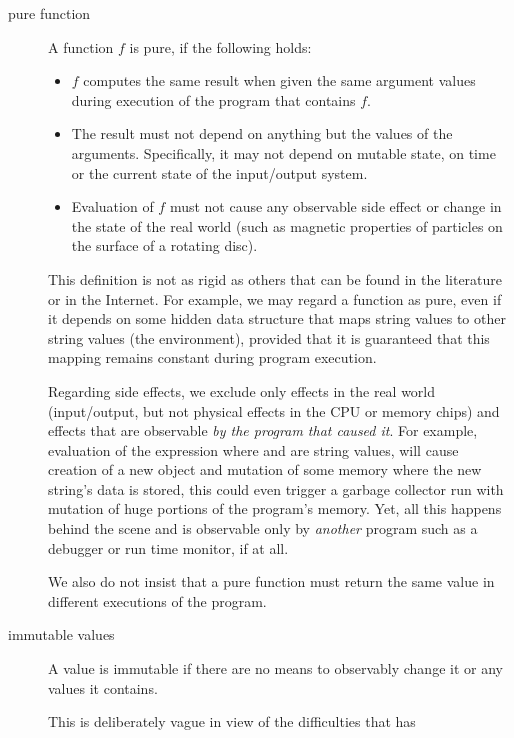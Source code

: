 \begin{description}
\item[pure function] A function $f$ is pure, if the following holds:
\begin{itemize}
\item $f$ computes the same result when given the same argument values during execution of the program that contains $f$.
\item The result must not depend on anything but the values of the arguments. Specifically, it may not depend on mutable state, on time or the current state of the input/output system.
\item Evaluation of $f$ must not cause any observable side effect or change in the state of the real world (such as magnetic properties of particles on the surface of a rotating disc).
\end{itemize}
This definition is not as rigid as others that can be found in the literature or in the Internet. For example, we may regard a function  as pure, even if it depends on some hidden data structure that maps string values to other string values (the environment), provided that it is guaranteed that this mapping remains constant during program execution. 

Regarding side effects, we exclude only effects in the real world (input/output, but not physical effects in the CPU or memory chips) and effects that are observable \emph{by the program that caused it}. For example, evaluation of the expression
where  and  are string values, will cause creation of a new \java{}  object and mutation of some memory where the new string's data is stored, this could even trigger a garbage collector run with mutation of huge portions of the program's memory. Yet, all this happens behind the scene and is observable only by \emph{another} program such as a debugger or run time monitor, if at all.

We also do not insist that a pure function must return the same value in different executions of the program. 

\item[immutable values] A value is immutable if there are no means to observably change it or any values it contains.

This is deliberately vague in view of the difficulties that \java{} has 


\end{description}

